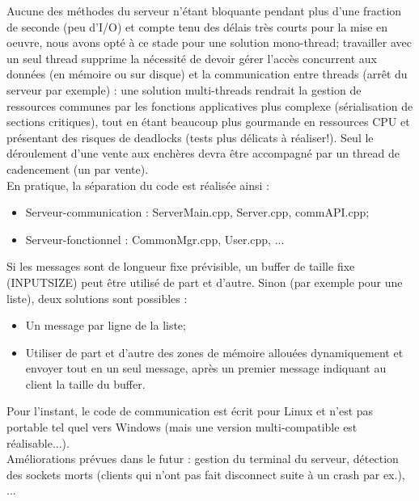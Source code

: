 \documentclass[a4paper,titlepage]{scrreprt}
\begin{document}
Aucune des méthodes du serveur n'étant bloquante pendant plus d'une fraction de seconde (peu d'I/O) et compte tenu des délais très courts pour la mise en oeuvre, nous avons opté à ce stade pour une solution mono-thread;
travailler avec un seul thread supprime la nécessité de devoir gérer l'accès concurrent aux données (en mémoire ou sur disque) et la communication entre threads (arrêt du serveur par exemple) :
une solution multi-threads rendrait la gestion de ressources communes par les fonctions applicatives plus complexe (sérialisation de sections critiques), tout en étant beaucoup plus gourmande en ressources CPU et présentant des risques de deadlocks (tests plus délicats à réaliser!). Seul le déroulement d'une vente aux enchères devra être accompagné par un thread de cadencement (un par vente).\\

En pratique, la séparation du code est réalisée ainsi :
\begin{itemize}
  \item Serveur-communication : ServerMain.cpp, Server.cpp, commAPI.cpp;
  \item Serveur-fonctionnel : CommonMgr.cpp, User.cpp, ...
\end{itemize}
Si les messages sont de longueur fixe prévisible, un buffer de taille fixe (INPUTSIZE) peut être utilisé de part et d'autre.
Sinon (par exemple pour une liste), deux solutions sont possibles :
\begin{itemize}
  \item Un message par ligne de la liste;
  \item Utiliser de part et d'autre des zones de mémoire allouées dynamiquement et envoyer tout en un seul message, après un premier message indiquant au client la taille du buffer.
\end{itemize}
Pour l'instant, le code de communication est écrit pour Linux et n'est pas portable tel quel vers Windows (mais une version multi-compatible est réalisable...).\\
Améliorations prévues dans le futur : gestion du terminal du serveur, détection des sockets morts (clients qui n'ont pas fait disconnect suite à un crash par ex.), ...
\end{document}
